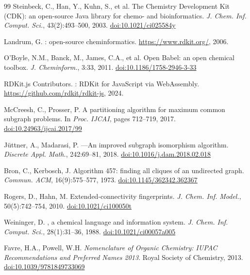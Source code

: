 \documentclass[twocolumn]{article}
\begin{document}
\begin{thebibliography}{99}
Steinbeck, C., Han, Y., Kuhn, S., {et al.}
\newblock The {Chemistry Development Kit (CDK)}: an open-source {Java} library
  for chemo- and bioinformatics.
\newblock \emph{J. Chem. Inf. Comput. Sci.}, 43(2):493--500, 2003.
\newblock \href{https://doi.org/10.1021/ci025584y}{doi:10.1021/ci025584y}

Landrum, G.
: open-source cheminformatics.
\newblock \url{https://www.rdkit.org/}, 2006.

O'Boyle, N.M., Banck, M., James, C.A., {et al.}
\newblock Open Babel: an open chemical toolbox.
\newblock \emph{J. Cheminform.}, 3:33, 2011.
\newblock \href{https://doi.org/10.1186/1758-2946-3-33}{doi:10.1186/1758-2946-3-33}

RDKit.js Contributors.
: {RDKit} for {JavaScript} via {WebAssembly}.
\newblock \url{https://github.com/rdkit/rdkit-js}, 2024.

McCreesh, C., Prosser, P.
\newblock A partitioning algorithm for maximum common subgraph problems.
\newblock In \emph{Proc. IJCAI}, pages 712--719, 2017.
\newblock \href{https://doi.org/10.24963/ijcai.2017/99}{doi:10.24963/ijcai.2017/99}

J\"uttner, A., Madarasi, P.
---An improved subgraph isomorphism algorithm.
\newblock \emph{Discrete Appl. Math.}, 242:69--81, 2018.
\newblock \href{https://doi.org/10.1016/j.dam.2018.02.018}{doi:10.1016/j.dam.2018.02.018}

Bron, C., Kerbosch, J.
\newblock Algorithm 457: finding all cliques of an undirected graph.
\newblock \emph{Commun. ACM}, 16(9):575--577, 1973.
\newblock \href{https://doi.org/10.1145/362342.362367}{doi:10.1145/362342.362367}

Rogers, D., Hahn, M.
\newblock Extended-connectivity fingerprints.
\newblock \emph{J. Chem. Inf. Model.}, 50(5):742--754, 2010.
\newblock \href{https://doi.org/10.1021/ci100050t}{doi:10.1021/ci100050t}

Weininger, D.
, a chemical language and information system.
\newblock \emph{J. Chem. Inf. Comput. Sci.}, 28(1):31--36, 1988.
\newblock \href{https://doi.org/10.1021/ci00057a005}{doi:10.1021/ci00057a005}

Favre, H.A., Powell, W.H.
\newblock \emph{Nomenclature of Organic Chemistry: IUPAC Recommendations and
  Preferred Names 2013}.
\newblock Royal Society of Chemistry, 2013.
\newblock \href{https://doi.org/10.1039/9781849733069}{doi:10.1039/9781849733069}


\end{thebibliography}
\end{document}
